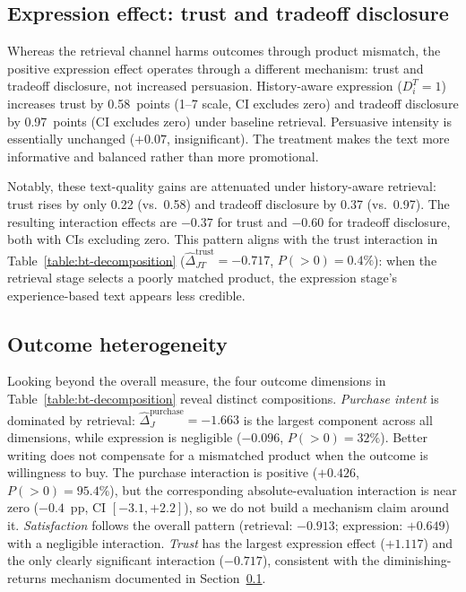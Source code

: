 \documentclass[11pt]{article}
\begin{document}
\subsection{Expression effect: trust and tradeoff disclosure}\label{section:expression-mechanism}

Whereas the retrieval channel harms outcomes through product mismatch, the positive expression effect operates through a different mechanism: trust and tradeoff disclosure, not increased persuasion. History-aware expression ($D_i^T = 1$) increases trust by 0.58~points (1--7 scale, CI excludes zero) and tradeoff disclosure by 0.97~points (CI excludes zero) under baseline retrieval. Persuasive intensity is essentially unchanged ($+0.07$, insignificant). The treatment makes the text more informative and balanced rather than more promotional.

Notably, these text-quality gains are attenuated under history-aware retrieval: trust rises by only 0.22 (vs.\ 0.58) and tradeoff disclosure by 0.37 (vs.\ 0.97). The resulting interaction effects are $-0.37$ for trust and $-0.60$ for tradeoff disclosure, both with CIs excluding zero. This pattern aligns with the trust interaction in Table~\ref{table:bt-decomposition} ($\hat{\Delta}_{JT}^{\mathrm{trust}} = -0.717$, $P(>0) = 0.4\%$): when the retrieval stage selects a poorly matched product, the expression stage's experience-based text appears less credible.

\subsection{Outcome heterogeneity}

Looking beyond the overall measure, the four outcome dimensions in Table~\ref{table:bt-decomposition} reveal distinct compositions. \emph{Purchase intent} is dominated by retrieval: $\hat{\Delta}_J^{\mathrm{purchase}} = -1.663$ is the largest component across all dimensions, while expression is negligible ($-0.096$, $P(>0) = 32\%$). Better writing does not compensate for a mismatched product when the outcome is willingness to buy. The purchase interaction is positive ($+0.426$, $P(>0) = 95.4\%$), but the corresponding absolute-evaluation interaction is near zero ($-0.4$~pp, CI $[-3.1, +2.2]$), so we do not build a mechanism claim around it. \emph{Satisfaction} follows the overall pattern (retrieval: $-0.913$; expression: $+0.649$) with a negligible interaction. \emph{Trust} has the largest expression effect ($+1.117$) and the only clearly significant interaction ($-0.717$), consistent with the diminishing-returns mechanism documented in Section~\ref{section:expression-mechanism}.
\end{document}
